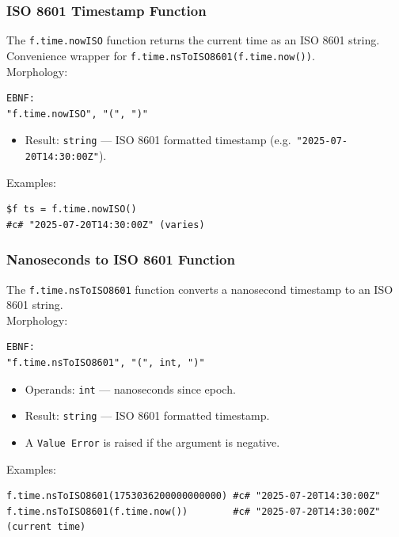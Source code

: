 \subsubsection{ISO 8601 Timestamp Function}
The \texttt{f.time.nowISO} function returns the current time as an ISO 8601 string. Convenience wrapper for \texttt{f.time.nsToISO8601(f.time.now())}. \\
Morphology:
\begin{verbatim}
EBNF:
"f.time.nowISO", "(", ")"
\end{verbatim}
\begin{itemize}
\item Result: \texttt{string} --- ISO 8601 formatted timestamp (e.g.\ \texttt{"2025-07-20T14:30:00Z"}).
\end{itemize}
Examples:
\begin{verbatim}
$f ts = f.time.nowISO()
#c# "2025-07-20T14:30:00Z" (varies)
\end{verbatim}

\subsubsection{Nanoseconds to ISO 8601 Function}
The \texttt{f.time.nsToISO8601} function converts a nanosecond timestamp to an ISO 8601 string. \\
Morphology:
\begin{verbatim}
EBNF:
"f.time.nsToISO8601", "(", int, ")"
\end{verbatim}
\begin{itemize}
\item Operands: \texttt{int} --- nanoseconds since epoch.
\item Result: \texttt{string} --- ISO 8601 formatted timestamp.
\item A \texttt{Value Error} is raised if the argument is negative.
\end{itemize}
Examples:
\begin{verbatim}
f.time.nsToISO8601(1753036200000000000) #c# "2025-07-20T14:30:00Z"
f.time.nsToISO8601(f.time.now())        #c# "2025-07-20T14:30:00Z" (current time)
\end{verbatim}

